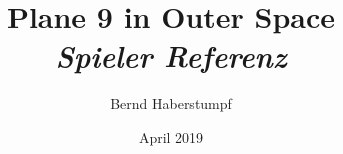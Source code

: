 \documentclass[helvetica,a4paper,11pt,german]{article}
\title{\Huge{}Plane 9 in Outer Space\\\smallskip\large\it{}Spieler Referenz}
\author{Bernd Haberstumpf}
\date{April 2019}
\begin{document}
\maketitle
\tableofcontents




\begin{appendices}

\end{appendices}
\end{document}
